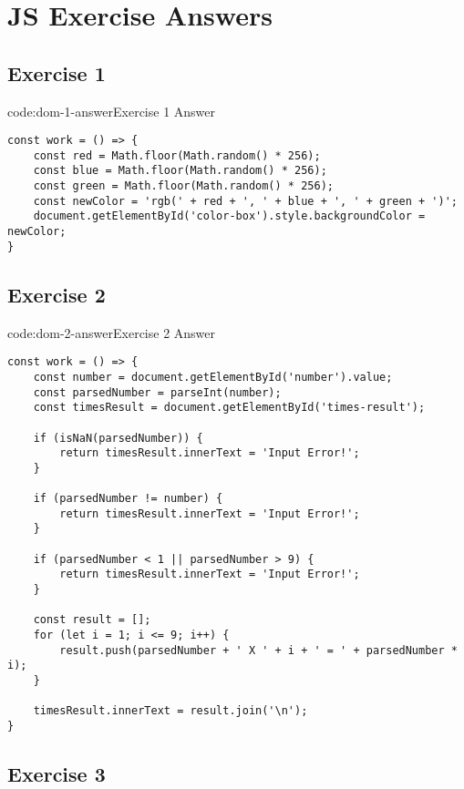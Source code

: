 \section{JS Exercise Answers} \label{sect:js-exercise-answers}

\subsection*{Exercise 1}

\begin{codeenv}{code:dom-1-answer}{Exercise 1 Answer}\begin{verbatim}
const work = () => {
    const red = Math.floor(Math.random() * 256);
    const blue = Math.floor(Math.random() * 256);
    const green = Math.floor(Math.random() * 256);
    const newColor = 'rgb(' + red + ', ' + blue + ', ' + green + ')';
    document.getElementById('color-box').style.backgroundColor = newColor;
}
\end{verbatim}
\end{codeenv}

\subsection*{Exercise 2}

\begin{codeenv}{code:dom-2-answer}{Exercise 2 Answer}\begin{verbatim}
const work = () => {
    const number = document.getElementById('number').value;
    const parsedNumber = parseInt(number);
    const timesResult = document.getElementById('times-result');

    if (isNaN(parsedNumber)) {
        return timesResult.innerText = 'Input Error!';
    }
    
    if (parsedNumber != number) {
        return timesResult.innerText = 'Input Error!';
    }

    if (parsedNumber < 1 || parsedNumber > 9) {
        return timesResult.innerText = 'Input Error!';
    }

    const result = [];
    for (let i = 1; i <= 9; i++) {
        result.push(parsedNumber + ' X ' + i + ' = ' + parsedNumber * i);
    }

    timesResult.innerText = result.join('\n');
}
\end{verbatim}
\end{codeenv}

\subsection*{Exercise 3}

